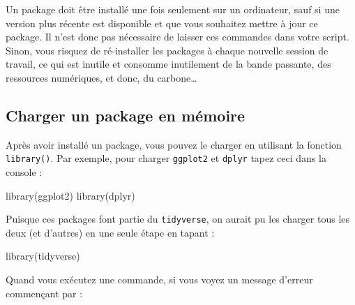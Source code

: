 \documentclass[
  a4paper,
  DIV=11,
  numbers=noendperiod,
  oneside]{scrreprt}
\newenvironment{Shaded}{}{}
\newcommand{\FunctionTok}[1]{\textcolor[rgb]{0.44,0.26,0.76}{#1}}
\newcommand{\NormalTok}[1]{\textcolor[rgb]{0.14,0.16,0.18}{#1}}
\begin{document}
\begin{tcolorbox}[enhanced jigsaw, coltitle=black, toprule=.15mm, opacityback=0, breakable, colback=white, opacitybacktitle=0.6, colframe=quarto-callout-note-color-frame, leftrule=.75mm, rightrule=.15mm, titlerule=0mm, bottomtitle=1mm, toptitle=1mm, arc=.35mm, title=\textcolor{quarto-callout-note-color}{\faInfo}\hspace{0.5em}{Note : \texttt{install.packages()}}, colbacktitle=quarto-callout-note-color!10!white, bottomrule=.15mm, left=2mm]

Un package doit être installé une fois seulement sur un ordinateur, sauf
si une version plus récente est disponible et que vous souhaitez mettre
à jour ce package. Il n'est donc pas nécessaire de laisser ces commandes
dans votre script. Sinon, vous risquez de ré-installer les packages à
chaque nouvelle session de travail, ce qui est inutile et consomme
inutilement de la bande passante, des ressources numériques, et donc, du
carbone\ldots{} 

\end{tcolorbox}

\subsection{Charger un package en
mémoire}\label{charger-un-package-en-muxe9moire}

Après avoir installé un package, vous pouvez le charger en utilisant la
fonction \texttt{library()}. Par exemple, pour charger \texttt{ggplot2}
et \texttt{dplyr} tapez ceci dans la console :

\begin{Shaded}
\begin{Highlighting}[]
\FunctionTok{library}\NormalTok{(ggplot2)}
\FunctionTok{library}\NormalTok{(dplyr)}
\end{Highlighting}
\end{Shaded}

Puisque ces packages font partie du \texttt{tidyverse}, on aurait pu les
charger tous les deux (et d'autres) en une seule étape en tapant :

\begin{Shaded}
\begin{Highlighting}[]
\FunctionTok{library}\NormalTok{(tidyverse)}
\end{Highlighting}
\end{Shaded}

Quand vous exécutez une commande, si vous voyez un message d'erreur
commençant par :
\end{document}
